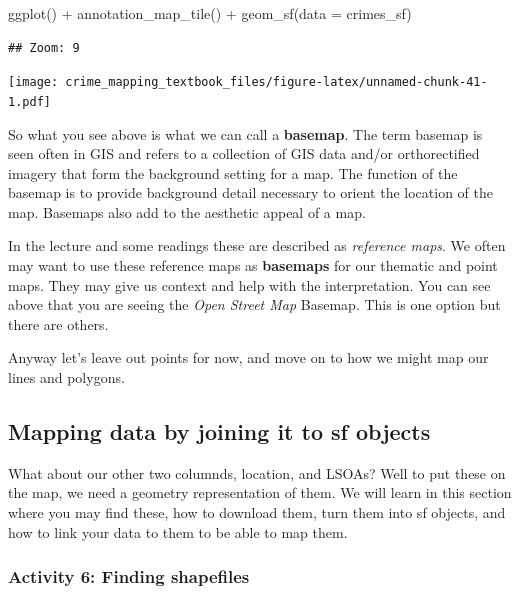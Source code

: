 \documentclass[
]{book}
\newenvironment{Shaded}{\begin{snugshade}}{\end{snugshade}}
\newcommand{\AttributeTok}[1]{\textcolor[rgb]{0.77,0.63,0.00}{#1}}
\newcommand{\FunctionTok}[1]{\textcolor[rgb]{0.00,0.00,0.00}{#1}}
\newcommand{\NormalTok}[1]{#1}
\newcommand{\SpecialCharTok}[1]{\textcolor[rgb]{0.00,0.00,0.00}{#1}}
\begin{document}
\begin{Shaded}
\begin{Highlighting}[]
\FunctionTok{ggplot}\NormalTok{() }\SpecialCharTok{+} 
 \FunctionTok{annotation\_map\_tile}\NormalTok{() }\SpecialCharTok{+}
  \FunctionTok{geom\_sf}\NormalTok{(}\AttributeTok{data =}\NormalTok{ crimes\_sf)}
\end{Highlighting}
\end{Shaded}

\begin{verbatim}
## Zoom: 9
\end{verbatim}

\texttt{[image: crime\_mapping\_textbook\_files/figure-latex/unnamed-chunk-41-1.pdf]}

So what you see above is what we can call a \textbf{basemap}. The term basemap is seen often in GIS and refers to a collection of GIS data and/or orthorectified imagery that form the background setting for a map. The function of the basemap is to provide background detail necessary to orient the location of the map. Basemaps also add to the aesthetic appeal of a map.

In the lecture and some readings these are described as \emph{reference maps}. We often may want to use these reference maps as \textbf{basemaps} for our thematic and point maps. They may give us context and help with the interpretation. You can see above that you are seeing the \emph{Open Street Map} Basemap. This is one option but there are others.

Anyway let's leave out points for now, and move on to how we might map our lines and polygons.

\hypertarget{mapping-data-by-joining-it-to-sf-objects}{%
\subsection{Mapping data by joining it to sf objects}\label{mapping-data-by-joining-it-to-sf-objects}}

What about our other two columnds, location, and LSOAs? Well to put these on the map, we need a geometry representation of them. We will learn in this section where you may find these, how to download them, turn them into sf objects, and how to link your data to them to be able to map them.

\hypertarget{activity-6-finding-shapefiles}{%
\subsubsection{Activity 6: Finding shapefiles}\label{activity-6-finding-shapefiles}}
\end{document}
